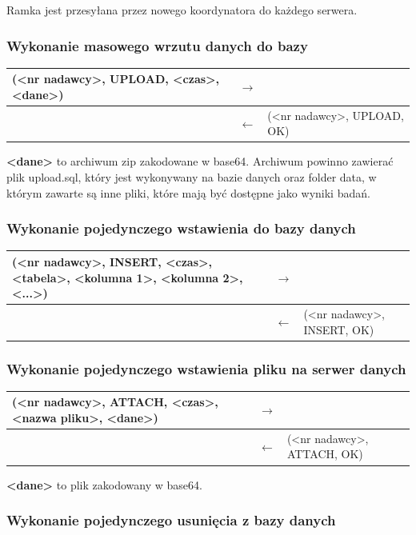 Ramka jest przesyłana przez nowego koordynatora do każdego serwera.

\subsubsection{Wykonanie masowego wrzutu danych do bazy}

\begin{longtable}{| p{} | p{}| p{} |} 
\hline
(<nr nadawcy>, UPLOAD, <czas>, <dane>) & $\rightarrow$ &  \\ \hline
 & $\leftarrow$ & (<nr nadawcy>, UPLOAD, OK) \\ \hline
\end{longtable}

\textbf{<dane>} to archiwum zip zakodowane w base64. Archiwum powinno zawierać plik upload.sql, który jest wykonywany na bazie danych oraz folder data, w którym zawarte są inne pliki, które mają być dostępne jako wyniki badań.

\subsubsection{Wykonanie pojedynczego wstawienia do bazy danych}

\begin{longtable}{| p{} | p{}| p{} |} 
\hline
(<nr nadawcy>, INSERT, <czas>, <tabela>, <kolumna 1>, <kolumna 2>, <...>) & $\rightarrow$ &  \\ \hline
 & $\leftarrow$ & (<nr nadawcy>, INSERT, OK) \\ \hline
\end{longtable}

\subsubsection{Wykonanie pojedynczego wstawienia pliku na serwer danych}

\begin{longtable}{| p{} | p{}| p{} |} 
\hline
(<nr nadawcy>, ATTACH, <czas>, <nazwa pliku>, <dane>) & $\rightarrow$ &  \\ \hline
 & $\leftarrow$ & (<nr nadawcy>, ATTACH, OK) \\ \hline
\end{longtable}
\textbf{<dane>} to plik zakodowany w base64.

\subsubsection{Wykonanie pojedynczego usunięcia z bazy danych}

